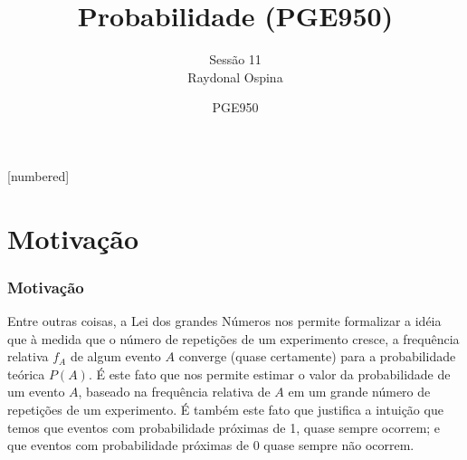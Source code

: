 


[numbered]



\hypersetup{colorlinks,linkcolor=,urlcolor=links}


\graphicspath{{./graphics/}} 			%

\newcommand{\cor}[1]{ \{{#1}\}}


\title[Probabilidade]{  Probabilidade (PGE950) }
\author[ Raydonal Ospina  
\ ]{
	Sessão 11 \\
	${}$ \\
	Raydonal Ospina  }
\date[PGE950 - \today ]{{\tiny PGE950 }}






\begin{frame}
  \titlepage
\end{frame}


\section{Motivação}
\begin{frame}
\frametitle{\textbf{Motivação}}
\baselineskip=13pt
\begin{block}{}
	
	
	Entre outras coisas, a Lei dos grandes Números nos permite
	formalizar a idéia que à medida que o número de repetições de um
	experimento cresce, a frequência relativa $f_A$ de algum evento $A$
	converge (quase certamente) para a probabilidade teórica $P(A)$. É
	este fato que nos permite estimar o valor da probabilidade de um
	evento $A$, baseado na frequência relativa de $A$ em um grande
	número de repetições de um experimento. É também este fato que justifica a intuição que temos que eventos com probabilidade próximas de 1, quase sempre ocorrem; e que eventos com probabilidade próximas de 0 quase sempre não ocorrem.
\end{block}
\end{frame}


